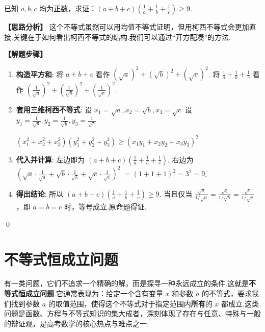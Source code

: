 \begin{exercise}
	已知 $a,b,c$ 均为正数，求证：$(a+b+c)(\frac{1}{a}+\frac{1}{b}+\frac{1}{c}) \ge 9$.
\end{exercise}
\begin{solution}
	\textbf{【思路分析】}
	\textcolor{green!50!black}{这个不等式虽然可以用均值不等式证明，但用柯西不等式会更加直接.关键在于如何看出柯西不等式的结构.我们可以通过“开方配凑”的方法.}
	
	\textbf{【解题步骤】}
	\begin{enumerate}
		\item \textbf{构造平方和}:
		将 $a+b+c$ 看作 $(\sqrt{a})^2 + (\sqrt{b})^2 + (\sqrt{c})^2$.
		将 $\frac{1}{a}+\frac{1}{b}+\frac{1}{c}$ 看作 $(\frac{1}{\sqrt{a}})^2 + (\frac{1}{\sqrt{b}})^2 + (\frac{1}{\sqrt{c}})^2$.
		
		\item \textbf{套用三维柯西不等式}:
		设 $x_1=\sqrt{a}, x_2=\sqrt{b}, x_3=\sqrt{c}$
		设 $y_1=\frac{1}{\sqrt{a}}, y_2=\frac{1}{\sqrt{b}}, y_3=\frac{1}{\sqrt{c}}$
		
		$(x_1^2+x_2^2+x_3^2)(y_1^2+y_2^2+y_3^2) \ge (x_1y_1+x_2y_2+x_3y_3)^2$
		
		\item \textbf{代入并计算}:
		左边即为 $(a+b+c)(\frac{1}{a}+\frac{1}{b}+\frac{1}{c})$.
		右边为 $(\sqrt{a}\cdot\frac{1}{\sqrt{a}} + \sqrt{b}\cdot\frac{1}{\sqrt{b}} + \sqrt{c}\cdot\frac{1}{\sqrt{c}})^2$
		$= (1+1+1)^2 = 3^2 = 9$.
		
		\item \textbf{得出结论}:
		所以 $(a+b+c)(\frac{1}{a}+\frac{1}{b}+\frac{1}{c}) \ge 9$.
		当且仅当 $\frac{\sqrt{a}}{1/\sqrt{a}} = \frac{\sqrt{b}}{1/\sqrt{b}} = \frac{\sqrt{c}}{1/\sqrt{c}}$，即 $a=b=c$ 时，等号成立.原命题得证.
	\end{enumerate}
\end{solution}
\qed


\section{不等式恒成立问题}

有一类问题，它们不追求一个精确的解，而是探寻一种永远成立的条件.这就是\textbf{不等式恒成立问题}.它通常表现为：给定一个含有变量 $x$ 和参数 $a$ 的不等式，要求我们找到参数 $a$ 的取值范围，使得这个不等式对于指定范围内\textbf{所有}的 $x$ 都成立.这类问题是函数、方程与不等式知识的集大成者，深刻体现了存在与任意、特殊与一般的辩证观，是高考数学的核心热点与难点之一.


